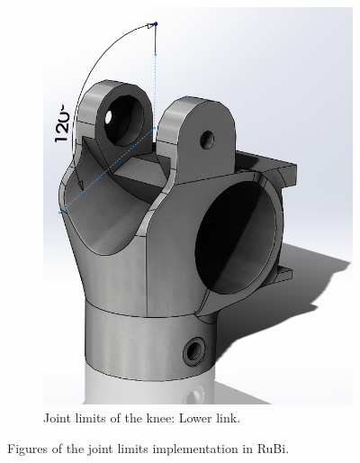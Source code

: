 \begin{figure}[ht!]
\begin{subfigure}[b]{0.35\textwidth}
        \includegraphics[width=\textwidth]{figures/joint_limits_knee_lower.PNG}
        \caption{Joint limits of the knee: Lower link.}
        \label{fig:joint_limits_knee_lower}
    \end{subfigure}
    \caption{Figures of the joint limits implementation in RuBi.}
\end{figure}    

